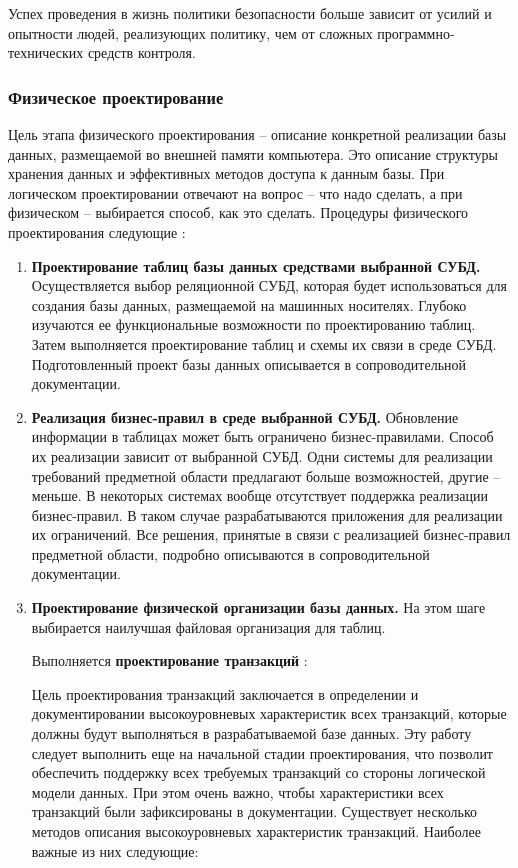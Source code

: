 Успех проведения в жизнь политики безопасности больше зависит от усилий и опытности людей, реализующих политику,
чем от сложных программно-технических средств контроля.

\subsubsection{Физическое проектирование}

Цель этапа физического проектирования – описание конкретной реализации базы данных, размещаемой во внешней
памяти компьютера. Это описание структуры хранения данных и эффективных методов доступа к данным базы. При
логическом проектировании отвечают на вопрос – что надо сделать, а при физическом – выбирается способ, как
это сделать. Процедуры физического проектирования следующие \autocite{oscerko}:
\begin{enumerate}
    \item \textbf{Проектирование таблиц базы данных средствами выбранной СУБД.}
        Осуществляется выбор реляционной СУБД, которая будет использоваться для создания базы данных,
        размещаемой на машинных носителях. Глубоко изучаются ее функциональные возможности по проектированию
        таблиц. Затем выполняется проектирование таблиц и схемы их связи в среде СУБД. Подготовленный проект
        базы данных описывается в сопроводительной документации.

    \item \textbf{Реализация бизнес-правил в среде выбранной СУБД.}
        Обновление информации в таблицах может быть ограничено бизнес-правилами. Способ их реализации
        зависит от выбранной СУБД. Одни системы для реализации требований предметной области предлагают
        больше возможностей, другие – меньше. В некоторых системах вообще отсутствует поддержка реализации
        бизнес-правил. В таком случае разрабатываются приложения для реализации их ограничений. Все решения,
        принятые в связи с реализацией бизнес-правил предметной области, подробно описываются в сопроводительной
        документации.

    \item \textbf{Проектирование физической организации базы данных.}
        На этом шаге выбирается наилучшая файловая организация для таблиц. 
        
        Выполняется \textbf{проектирование транзакций} \autocite{koch}:
        
        Цель проектирования транзакций заключается в определении и
        документировании высокоуровневых характеристик всех транзакций,
        которые должны будут выполняться в разрабатываемой базе данных. Эту
        работу следует выполнить еще на начальной стадии проектирования, что
        позволит обеспечить поддержку всех требуемых транзакций со стороны
        логической модели данных. При этом очень важно, чтобы характеристики
        всех транзакций были зафиксированы в документации. Существует
        несколько методов описания высокоуровневых характеристик транзакций.
        Наиболее важные из них следующие:
        

\end{enumerate}
